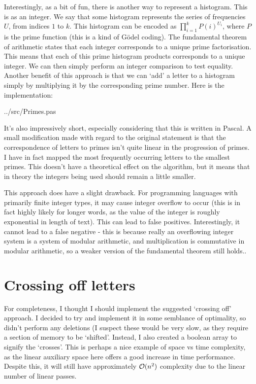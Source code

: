 \documentclass[fleqn,a4paper,11pt]{article}
\begin{document}
    Interestingly, as a bit of fun, there is another way to represent a
    histogram. This is as an integer. We say that some histogram represents the
    series of frequencies \(U\), from indices \(1\) to \(k\).  This histogram
    can be encoded as
    \(\prod_{i=1}^{k} P(i)^{U_i}\),
    where \(P\) is the prime function (this is a kind of G\"odel coding). The
    fundamental theorem of arithmetic states that each integer corresponds to a
    unique prime factorisation. This means that each of this prime histogram
    products corresponds to a unique integer. We can then simply perform an
    integer comparison to test equality.  Another benefit of this approach is
    that we can `add' a letter to a histogram simply by multiplying it by the
    corresponding prime number. Here is the implementation:


{../src/Primes.pas}

    It's also impressively short, especially considering that this is written in
    Pascal. A small modification made with regard to the original statement is
    that the correspondence of letters to primes isn't quite linear in the
    progression of primes. I have in fact mapped the most frequently occurring
    letters to the smallest primes. This doesn't have a theoretical effect on
    the algorithm, but it means that in theory the integers being used should
    remain a little smaller.

    This approach does have a slight drawback. For programming languages with
    primarily finite integer types, it may cause integer overflow to occur (this
    is in fact highly likely for longer words, as the value of the integer is
    roughly exponential in length of text). This can lead to false positives.
    Interestingly, it cannot lead to a false negative - this is because really
    an overflowing integer system is a system of modular arithmetic, and
    multiplication is commutative in modular arithmetic, so a weaker version of
    the fundamental theorem still holds..

    \section{Crossing off letters}

    For completeness, I thought I should implement the suggested `crossing off'
    approach. I decided to try and implement it in some semblance of optimality,
    so didn't perform any deletions (I suspect these would be very slow, as they
    require a section of memory to be `shifted'. Instead, I also created a
    boolean array to signify the `crosses'. This is perhaps a nice example of
    space vs time complexity, as the linear auxiliary space here offers a good
    increase in time performance. Despite this, it will still have approximately
    \(\operatorname{\mathcal O}(n^2)\) complexity due to the linear number of linear passes.
\end{document}
